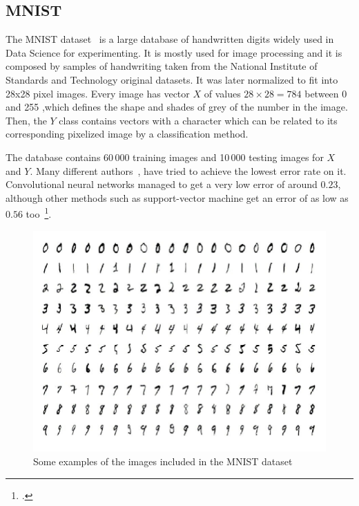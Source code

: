 \subsection{MNIST}
\label{subsec:MNIST}


The MNIST dataset~\cite{MNIST_article} is a large database of handwritten digits widely used in Data Science for experimenting. It is mostly used for image processing and it is composed by samples of handwriting taken from the National Institute of Standards and Technology original datasets. It was later normalized to fit into 28x28 pixel images. Every image has vector $X$ of values $28 \times 28 = 784$ between 0 and 255 ,which defines the shape and shades of grey of the number in the image. Then, the $Y$ class contains vectors with a character which can be related to its corresponding pixelized image by a classification method. \par

The database contains 60\,000 training images and 10\,000 testing images for $X$ and $Y$. Many different authors~\cite{MNIST_classification_example}, have tried to achieve the lowest error rate on it. Convolutional neural networks managed to get a very low error of around $0.23$, although other methods such as support-vector machine get an error of as low as $0.56$ too~\footcite{wiki:MNIST}.
%
\begin{figure}[H]
\centering
  \includegraphics[width=16cm]{Figuras_tfg/Figure_MNIST}
  \caption{Some examples of the images included in the MNIST dataset}
 \label{fig:figure_MNIST}
\end{figure}


